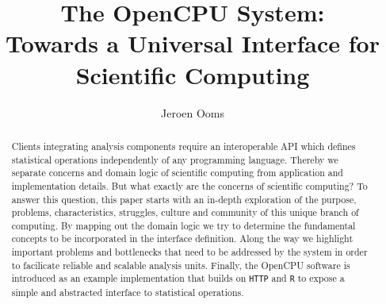 \documentclass{article}
\author{Jeroen Ooms}
\title{The OpenCPU System:\\ Towards a Universal Interface for Scientific Computing}
\newcommand{\R}{\texttt{R}\xspace}
\newcommand{\HTTP}{\texttt{HTTP}\xspace}
\begin{document}
\maketitle

\begin{abstract}
Clients integrating analysis components require an interoperable API which defines statistical operations independently of any programming language. Thereby we separate concerns and domain logic of scientific computing from application and implementation details. But what exactly are the concerns of scientific computing? To answer this question, this paper starts with an in-depth exploration of the purpose, problems, characteristics, struggles, culture and community of this unique branch of computing. By mapping out the domain logic we try to determine the fundamental concepts to be incorporated in the interface definition. Along the way we highlight important problems and bottlenecks that need to be addressed by the system in order to facilicate reliable and scalable analysis units. Finally, the OpenCPU software is introduced as an example implementation that builds on \HTTP and \R to expose a simple and abstracted interface to statistical operations.
\end{abstract}







 






\end{document}
